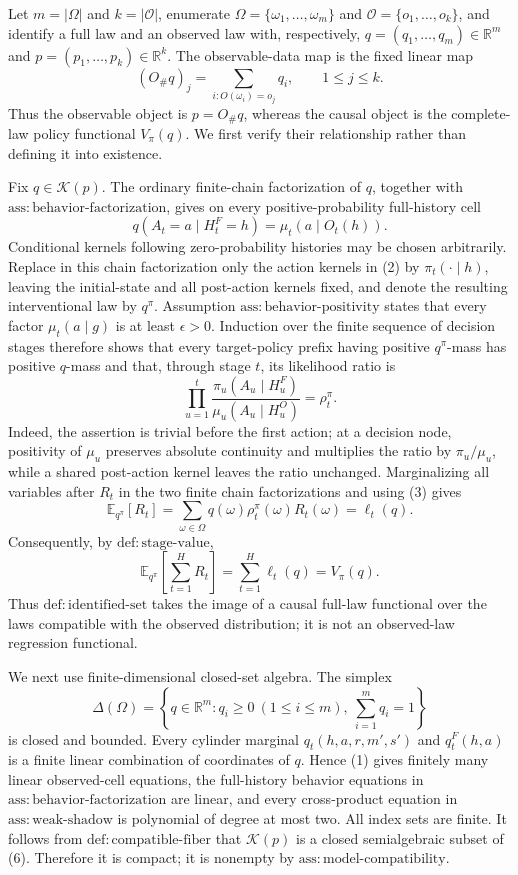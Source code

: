 Let \(m=|\Omega|\) and \(k=|\mathcal O|\), enumerate \(\Omega=\{\omega_1,\ldots,\omega_m\}\) and \(\mathcal O=\{o_1,\ldots,o_k\}\), and identify a full law and an observed law with, respectively, \(q=(q_1,\ldots,q_m)\in\mathbb R^m\) and \(p=(p_1,\ldots,p_k)\in\mathbb R^k\).  The observable-data map is the fixed linear map
\[
 (O_\#q)_j=\sum_{i:O(\omega_i)=o_j}q_i,
 \qquad 1\leq j\leq k.
\tag{1}
\]
Thus the observable object is \(p=O_\#q\), whereas the causal object is the complete-law policy functional \(V_\pi(q)\).  We first verify their relationship rather than defining it into existence.

Fix \(q\in\mathcal K(p)\).  The ordinary finite-chain factorization of \(q\), together with \(\mathrm{ass{:}behavior\text{-}factorization}\), gives on every positive-probability full-history cell
\[
 q(A_t=a\mid H_t^F=h)=\mu_t(a\mid O_t(h)).
\tag{2}
\]
Conditional kernels following zero-probability histories may be chosen arbitrarily.  Replace in this chain factorization only the action kernels in (2) by \(\pi_t(\cdot\mid h)\), leaving the initial-state and all post-action kernels fixed, and denote the resulting interventional law by \(q^\pi\).  Assumption \(\mathrm{ass{:}behavior\text{-}positivity}\) states that every factor \(\mu_t(a\mid g)\) is at least \(\epsilon>0\).  Induction over the finite sequence of decision stages therefore shows that every target-policy prefix having positive \(q^\pi\)-mass has positive \(q\)-mass and that, through stage \(t\), its likelihood ratio is
\[
 \prod_{u=1}^t
 \frac{\pi_u(A_u\mid H_u^F)}{\mu_u(A_u\mid H_u^O)}
 =\rho_t^\pi.
\tag{3}
\]
Indeed, the assertion is trivial before the first action; at a decision node, positivity of \(\mu_u\) preserves absolute continuity and multiplies the ratio by \(\pi_u/\mu_u\), while a shared post-action kernel leaves the ratio unchanged.  Marginalizing all variables after \(R_t\) in the two finite chain factorizations and using (3) gives
\[
 \mathbb E_{q^\pi}[R_t]
 =\sum_{\omega\in\Omega}q(\omega)\rho_t^\pi(\omega)R_t(\omega)
 =\ell_t(q).
\tag{4}
\]
Consequently, by \(\mathrm{def{:}stage\text{-}value}\),
\[
 \mathbb E_{q^\pi}\!\left[\sum_{t=1}^H R_t\right]
 =\sum_{t=1}^H\ell_t(q)=V_\pi(q).
\tag{5}
\]
Thus \(\mathrm{def{:}identified\text{-}set}\) takes the image of a causal full-law functional over the laws compatible with the observed distribution; it is not an observed-law regression functional.

We next use finite-dimensional closed-set algebra.  The simplex
\[
 \Delta(\Omega)=\left\{q\in\mathbb R^m:q_i\geq0\ (1\leq i\leq m),\ \sum_{i=1}^m q_i=1\right\}
\tag{6}
\]
is closed and bounded.  Every cylinder marginal \(q_t(h,a,r,m',s')\) and \(q_t^F(h,a)\) is a finite linear combination of coordinates of \(q\).  Hence (1) gives finitely many linear observed-cell equations, the full-history behavior equations in \(\mathrm{ass{:}behavior\text{-}factorization}\) are linear, and every cross-product equation in \(\mathrm{ass{:}weak\text{-}shadow}\) is polynomial of degree at most two.  All index sets are finite.  It follows from \(\mathrm{def{:}compatible\text{-}fiber}\) that \(\mathcal K(p)\) is a closed semialgebraic subset of (6).  Therefore it is compact; it is nonempty by \(\mathrm{ass{:}model\text{-}compatibility}\).

